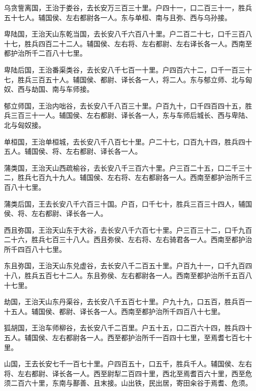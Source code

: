 \documentclass[12pt,UTF8]{ctexbook}
\begin{document}
乌贪訾离国，王治于娄谷，去长安万三百三十里。户四十一，口二百三十一，胜兵五十七人。辅国侯、左右都尉各一人。东与单桓、南与且弥、西与乌孙接。



卑陆国，王治天山东乾当国，去长安八千六百八十里。户二百二十七，口千三百八十七，胜兵四百二十二人。辅国侯、左右将、左右都尉、左右译长各一人。西南至都护治所千二百八十七里。



卑陆后国，王治番渠类谷，去长安八千七百一十里。户四百六十二，口千一百三十七，胜兵三百五十人。辅国侯、都尉、译长各一人，将二人。东与郁立师、北与匈奴、西与劫国、南与车师接。



郁立师国，王治内咄谷，去长安八千八百三十里。户百九十，口千四百四十五，胜兵三百三十一人。辅国侯、左右都尉、译长各一人，东与车师后城长、西与卑陆、北与匈奴接。



单桓国，王治单桓城，去长安八千八百七十里。户二十七，口百九十四，胜兵四十五人。辅国侯、将、左右都尉、译长各一人。



蒲类国，王治天山西疏榆谷，去长安八千三百六十里。户三百二十五，口二千三十二，胜兵七百九十九人。辅国侯、左右将、左右都尉各一人。西南至都护治所千三百八十七里。



蒲类后国，王去长安八千六百三十国。户百，口千七十，胜兵三百三十四人，辅国侯、将、左右都尉、译长各一人。



西且弥国，王治天山东于大谷，去长安八千六百七十里。户三百三十二，口千九百二十六，胜兵七百三十八人。西且弥侯、左右将、左右骑君各一人。西南至都护治所千四百八十七里。



东且弥国，王治天山东兑虚谷，去长安八千二百五十里。户百九十一，口千九百四十八，胜兵五百七十二人。东且弥侯、左右都尉各一人。西南至都护治所千五百八十七里。



劫国，王治天山东丹渠谷，去长安八千五百七十里。户九十九，口五百，胜兵百一十五人。辅国侯、都尉、译长各一人。西南至都护治所千四百八十七里。



狐胡国，王治车师柳谷，去长安八千二百里。户五十五，口二百六十四，胜兵四十五人。辅国侯、左右都尉各一人。西至都护治所千一百四十七里，至焉耆七百七十里。



山国，王去长安七千一百七十里。户四百五十，口五千，胜兵千人。辅国侯、左右将、左右都尉、译长各一人。西至尉犁二百四十里，西北至焉耆百六十里，西至危须二百六十里，东南与鄯善、且末接。山出铁，民出居，寄田籴谷于焉耆、危须。
\end{document}
